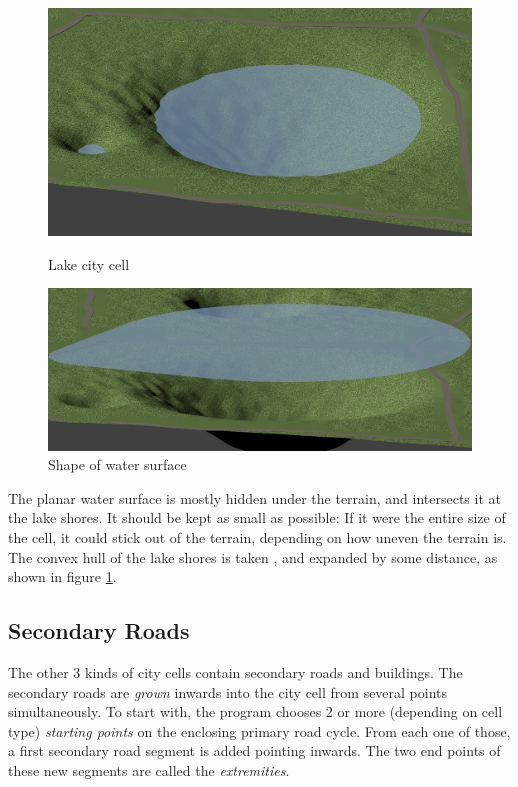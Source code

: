 \documentclass[a4paper,12pt]{scrartcl}
\begin{document}
\begin{figure}[h]
\center
\includegraphics[width=\textwidth]{lake.png}
\caption{Lake city cell}
\label{fig:lake}
\includegraphics[width=\textwidth]{lake_hull.png}
\caption{Shape of water surface}
\label{fig:lake_hull}
\end{figure}

The planar water surface is mostly hidden under the terrain, and intersects it at the lake shores. It should be kept as small as possible: If it were the entire size of the cell, it could stick out of the terrain, depending on how uneven the terrain is. The convex hull of the lake shores is taken , and expanded by some distance, as shown in figure \ref{fig:lake_hull}.


\subsection{Secondary Roads}
The other 3 kinds of city cells contain secondary roads and buildings. The secondary roads are \emph{grown} inwards into the city cell from several points simultaneously. To start with, the program chooses 2 or more (depending on cell type) \emph{starting points} on the enclosing primary road cycle. From each one of those, a first secondary road segment is added pointing inwards. The two end points of these new segments are called the \emph{extremities}.  
\end{document}
